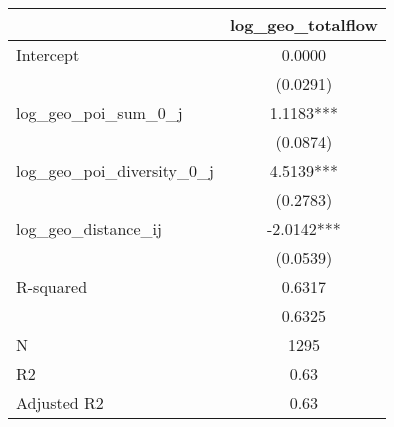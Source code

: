 \begin{table}
\caption{}
\begin{center}
\begin{tabular}{lc}
\hline
                               & log\_geo\_totalflow  \\
\midrule
Intercept                      & 0.0000               \\
                               & (0.0291)             \\
log\_geo\_poi\_sum\_0\_j       & 1.1183***            \\
                               & (0.0874)             \\
log\_geo\_poi\_diversity\_0\_j & 4.5139***            \\
                               & (0.2783)             \\
log\_geo\_distance\_ij         & -2.0142***           \\
                               & (0.0539)             \\
R-squared                      & 0.6317               \\
                               & 0.6325               \\
N                              & 1295                 \\
R2                             & 0.63                 \\
Adjusted R2                    & 0.63                 \\
\hline
\end{tabular}
\end{center}
\end{table}